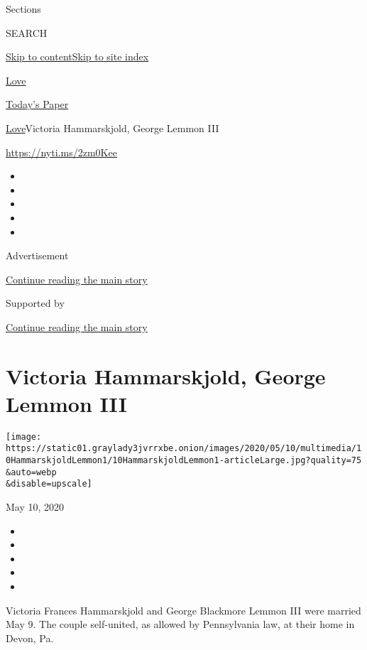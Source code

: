 Sections

SEARCH

\protect\hyperlink{site-content}{Skip to
content}\protect\hyperlink{site-index}{Skip to site index}

\href{https://www.nytimes3xbfgragh.onion/section/fashion/weddings}{Love}

\href{https://myaccount.nytimes3xbfgragh.onion/auth/login?response_type=cookie\&client_id=vi}{}

\href{https://www.nytimes3xbfgragh.onion/section/todayspaper}{Today's
Paper}

\href{/section/fashion/weddings}{Love}\textbar{}Victoria Hammarskjold,
George Lemmon III

\url{https://nyti.ms/2zm0Kee}

\begin{itemize}
\item
\item
\item
\item
\item
\end{itemize}

Advertisement

\protect\hyperlink{after-top}{Continue reading the main story}

Supported by

\protect\hyperlink{after-sponsor}{Continue reading the main story}

\hypertarget{victoria-hammarskjold-george-lemmon-iii}{%
\section{Victoria Hammarskjold, George Lemmon
III}\label{victoria-hammarskjold-george-lemmon-iii}}

\texttt{[image: https://static01.graylady3jvrrxbe.onion/images/2020/05/10/multimedia/10HammarskjoldLemmon1/10HammarskjoldLemmon1-articleLarge.jpg?quality=75\\\&auto=webp\\\&disable=upscale]}

May 10, 2020

\begin{itemize}
\item
\item
\item
\item
\item
\end{itemize}

Victoria Frances Hammarskjold and George Blackmore Lemmon III were
married May 9. The couple self-united, as allowed by Pennsylvania law,
at their home in Devon, Pa.

